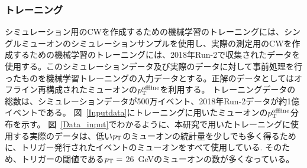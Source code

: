 \subsubsection{トレーニング}
シミュレーション用のCWを作成するための機械学習のトレーニングには、シングルミューオンのシミュレーションサンプルを使用し、実際の測定用のCWを作成するための機械学習のトレーニングには、2018年Run-2で収集されたデータを使用する。このシミュレーションデータ及び実際のデータに対して事前処理を行ったものを機械学習トレーニングの入力データとする。正解のデータとしてはオフライン再構成されたミューオンの$p_{\rm{T}}^{\rm{offline}}$を利用する。
トレーニングデータの総数は、シミュレーションデータが500万イベント、2018年Run-2データが約1億イベントである。
図~\ref{Inputdata}にトレーニングに用いたミューオンの$p_{\rm{T}}^{\rm{offline}}$分布を示す。
図~\ref{Data_input}でわかるように、本研究で用いたトレーニングに使用する実際のデータは、低い$p_{\rm{T}}$のミューオンの統計量を少しでも多く得るために、トリガー発行されたイベントのミューオンをすべて使用している.
そのため、トリガーの閾値である$p_{\rm{T}}=$ 26~GeVのミューオンの数が多くなっている。


